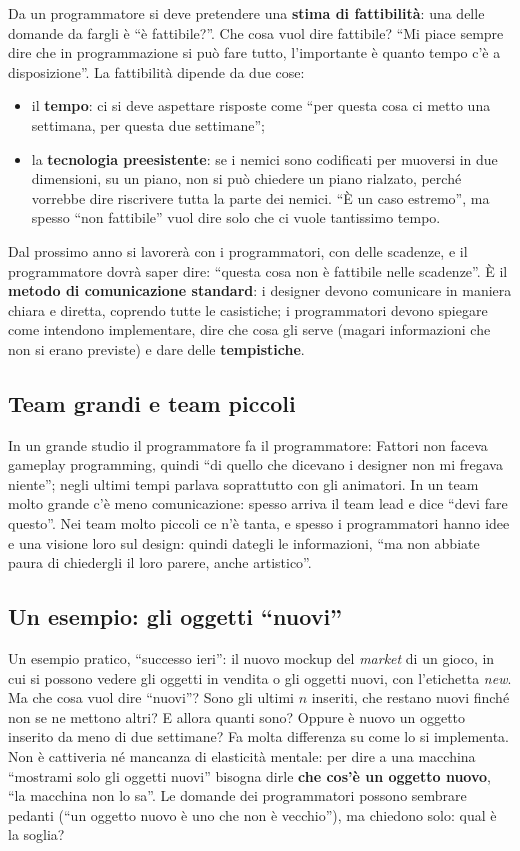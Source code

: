 Da un programmatore si deve pretendere una \textbf{stima di fattibilità}: una
delle domande da fargli è ``è fattibile?''. Che cosa vuol dire fattibile?
``Mi piace sempre dire che in programmazione si può fare tutto, l'importante è
quanto tempo c'è a disposizione''. La fattibilità dipende da due cose:
\begin{itemize}
  \item il \textbf{tempo}: ci si deve aspettare risposte come ``per questa cosa
        ci metto una settimana, per questa due settimane'';
  \item la \textbf{tecnologia preesistente}: se i nemici sono codificati per
        muoversi in due dimensioni, su un piano, non si può chiedere un piano
        rialzato, perché vorrebbe dire riscrivere tutta la parte dei nemici.
        ``È un caso estremo'', ma spesso ``non fattibile'' vuol dire solo che
        ci vuole tantissimo tempo.
\end{itemize}
Dal prossimo anno si lavorerà con i programmatori, con delle scadenze, e il
programmatore dovrà saper dire: ``questa cosa non è fattibile nelle
scadenze''. È il \textbf{metodo di comunicazione standard}: i designer devono
comunicare in maniera chiara e diretta, coprendo tutte le casistiche; i
programmatori devono spiegare come intendono implementare, dire che cosa gli
serve (magari informazioni che non si erano previste) e dare delle
\textbf{tempistiche}.

\subsection{Team grandi e team piccoli}

In un grande studio il programmatore fa il programmatore: Fattori non faceva
gameplay programming, quindi ``di quello che dicevano i designer non mi
fregava niente''; negli ultimi tempi parlava soprattutto con gli animatori.
In un team molto grande c'è meno comunicazione: spesso arriva il team lead e
dice ``devi fare questo''. Nei team molto piccoli ce n'è tanta, e spesso i
programmatori hanno idee e una visione loro sul design: quindi dategli le
informazioni, ``ma non abbiate paura di chiedergli il loro parere, anche
artistico''.

\subsection{Un esempio: gli oggetti ``nuovi''}

Un esempio pratico, ``successo ieri'': il nuovo mockup del \emph{market} di un
gioco, in cui si possono vedere gli oggetti in vendita o gli oggetti nuovi,
con l'etichetta \emph{new}. Ma che cosa vuol dire ``nuovi''? Sono gli ultimi
$n$ inseriti, che restano nuovi finché non se ne mettono altri? E allora
quanti sono? Oppure è nuovo un oggetto inserito da meno di due settimane? Fa
molta differenza su come lo si implementa. Non è cattiveria né mancanza di
elasticità mentale: per dire a una macchina ``mostrami solo gli oggetti
nuovi'' bisogna dirle \textbf{che cos'è un oggetto nuovo}, ``la macchina non
lo sa''. Le domande dei programmatori possono sembrare pedanti (``un oggetto
nuovo è uno che non è vecchio''), ma chiedono solo: qual è la soglia?

